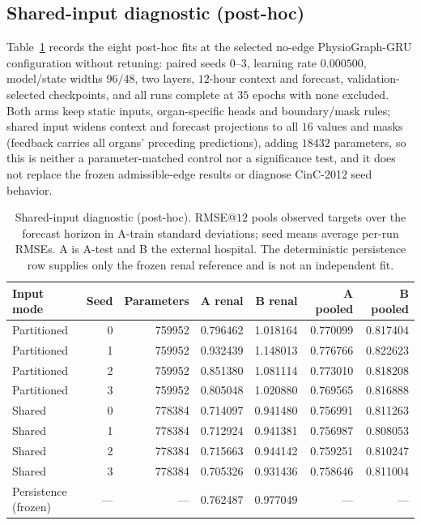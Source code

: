 \subsection{Shared-input diagnostic (post-hoc)}\label{app:sharedinput}
Table~\ref{tab:sharedinput} records the eight post-hoc fits at the selected no-edge PhysioGraph-GRU configuration without retuning: paired seeds $0$--$3$, learning rate $0.000500$, model/state widths $96/48$, two layers, $12$-hour context and forecast, validation-selected checkpoints, and all runs complete at $35$ epochs with none excluded.
Both arms keep static inputs, organ-specific heads and boundary/mask rules; shared input widens context and forecast projections to all $16$ values and masks (feedback carries all organs' preceding predictions), adding $18432$ parameters, so this is neither a parameter-matched control nor a significance test, and it does not replace the frozen admissible-edge results or diagnose CinC-2012 seed behavior.

\begin{table}[tbp]
\centering
\caption{Shared-input diagnostic (post-hoc). RMSE@$12$ pools observed targets over the forecast horizon in A-train standard deviations; seed means average per-run RMSEs. A is A-test and B the external hospital. The deterministic persistence row supplies only the frozen renal reference and is not an independent fit.}\label{tab:sharedinput}
\small
\begin{tabular}{lrrrrrr}
\toprule
Input mode & Seed & Parameters & A renal & B renal & A pooled & B pooled \\
\midrule
Partitioned & 0 & 759952 & 0.796462 & 1.018164 & 0.770099 & 0.817404 \\ 
Partitioned & 1 & 759952 & 0.932439 & 1.148013 & 0.776766 & 0.822623 \\ 
Partitioned & 2 & 759952 & 0.851380 & 1.081114 & 0.773010 & 0.818208 \\ 
Partitioned & 3 & 759952 & 0.805048 & 1.020880 & 0.769565 & 0.816888 \\ 
Shared & 0 & 778384 & 0.714097 & 0.941480 & 0.756991 & 0.811263 \\ 
Shared & 1 & 778384 & 0.712924 & 0.941381 & 0.756987 & 0.808053 \\ 
Shared & 2 & 778384 & 0.715663 & 0.944142 & 0.759251 & 0.810247 \\ 
Shared & 3 & 778384 & 0.705326 & 0.931436 & 0.758646 & 0.811004 \\ 
Persistence (frozen) & --- & --- & 0.762487 & 0.977049 & --- & --- \\ 
\bottomrule
\end{tabular}
\end{table}

